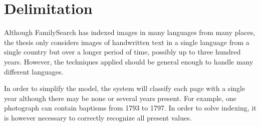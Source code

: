 \section{Delimitation}

Although FamilySearch has indexed images in many languages from many places,
the thesis only considers images of handwritten text in a single language from a single country but over a longer period of time, possibly up to three hundred years.
However, the techniques applied should be general enough to handle many different languages.


In order to simplify the model,
the system will classify each page with a single year although there may be none or several years present. For example, one photograph can contain baptisms from 1793 to 1797. In order to solve indexing, it is however necessary to correctly recognize all present values.
